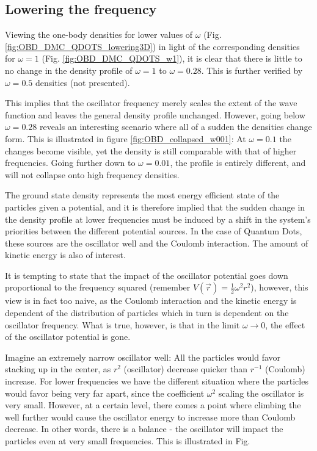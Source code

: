 \subsection{Lowering the frequency}

Viewing the one-body densities for lower values of $\omega$ (Fig. \ref{fig:OBD_DMC_QDOTS_lowering3D}) in light of the corresponding densities for $\omega=1$ (Fig. \ref{fig:OBD_DMC_QDOTS_w1}), it is clear that there is little to no change in the density profile of $\omega=1$ to $\omega=0.28$. This is further verified by $\omega=0.5$ densities (not presented). 

This implies that the oscillator frequency merely scales the extent of the wave function and leaves the general density profile unchanged. However, going below $\omega=0.28$ reveals an interesting scenario where all of a sudden the densities change form. This is illustrated in figure \ref{fig:OBD_collapsed_w001}: At $\omega=0.1$ the changes become visible, yet the density is still comparable with that of higher frequencies. Going further down to $\omega=0.01$, the profile is entirely different, and will not collapse onto high frequency densities.

The ground state density represents the most energy efficient state of the particles given a potential, and it is therefore implied that the sudden change in the density profile at lower frequencies must be induced by a shift in the system's priorities between the different potential sources. In the case of Quantum Dots, these sources are the oscillator well and the Coulomb interaction. The amount of kinetic energy is also of interest.

It is tempting to state that the impact of the oscillator potential goes down proportional to the frequency squared (remember $V(\vec r) = \frac{1}{2}\omega^2r^2$), however, this view is in fact too naive, as the Coulomb interaction and the kinetic energy is dependent of the distribution of particles which in turn is dependent on the oscillator frequency. What is true, however, is that in the limit $\omega\to 0$, the effect of the oscillator potential is gone. 

Imagine an extremely narrow oscillator well: All the particles would favor stacking up in the center, as $r^2$ (oscillator) decrease quicker than $r^{-1}$ (Coulomb) increase. For lower frequencies we have the different situation where the particles would favor being very far apart, since the coefficient $\omega^2$ scaling the oscillator is very small. However, at a certain level, there comes a point where climbing the well further would cause the oscillator energy to increase more than Coulomb decrease. In other words, there is a balance - the oscillator will impact the particles even at very small frequencies. This is illustrated in Fig.

